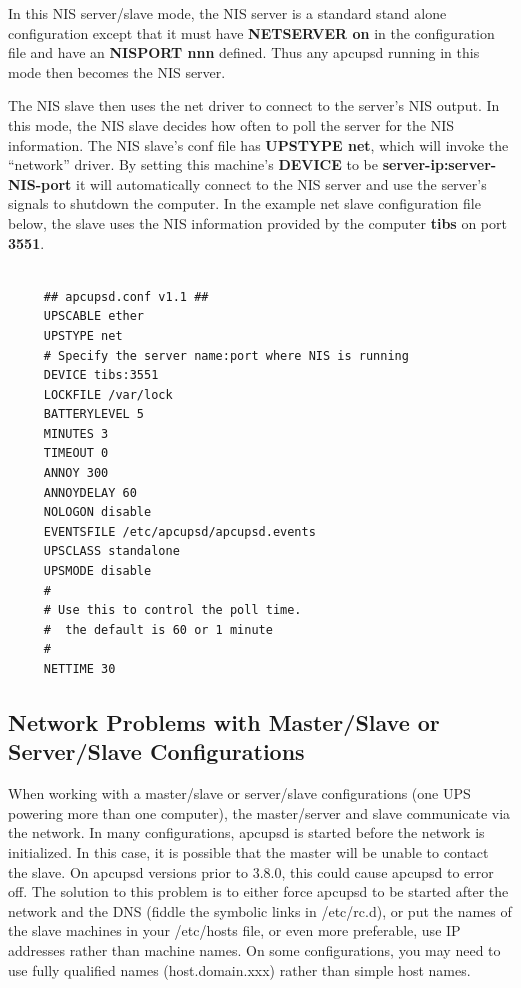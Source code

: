 {{{{{{{{{In this NIS server/slave mode, the NIS server is a standard stand alone
configuration except that it must have {\bf NETSERVER on} in the configuration
file and have an {\bf NISPORT nnn} defined. Thus any apcupsd running in this
mode then becomes the NIS server.  

The NIS slave then uses the net driver to connect to the server's NIS output.
In this mode, the NIS slave decides how often to poll the server for the NIS
information. The NIS slave's conf file has {\bf UPSTYPE net}, which will
invoke the ``network'' driver. By setting this machine's {\bf DEVICE} to be
{\bf server-ip:server-NIS-port} it will automatically connect to the NIS
server and use the server's signals to shutdown the computer.  In the example
net slave configuration file below, the slave uses the NIS information
provided by the computer {\bf tibs} on port {\bf 3551}. 

\footnotesize
\begin{verbatim}
     
     ## apcupsd.conf v1.1 ##
     UPSCABLE ether
     UPSTYPE net
     # Specify the server name:port where NIS is running
     DEVICE tibs:3551
     LOCKFILE /var/lock
     BATTERYLEVEL 5
     MINUTES 3
     TIMEOUT 0
     ANNOY 300
     ANNOYDELAY 60
     NOLOGON disable
     EVENTSFILE /etc/apcupsd/apcupsd.events
     UPSCLASS standalone
     UPSMODE disable
     #
     # Use this to control the poll time.
     #  the default is 60 or 1 minute
     #
     NETTIME 30
\end{verbatim}
\normalsize

\label{Network-Problems-with-Master_002fSlave-or-Server_002fSlave-Configuratio%
ns}

\subsection*{Network Problems with Master/Slave or Server/Slave
Configurations}

\label{index-Problems_002c-Master_002fSlave-159}
\label{index-Problems_002c-networking-160}
When working with a master/slave or server/slave configurations (one UPS
powering more than one computer), the master/server and slave communicate via
the network. In many configurations, apcupsd is started before the network is
initialized. In this case, it is possible that the master will be unable to
contact the slave. On apcupsd versions prior to 3.8.0, this could cause
apcupsd to error off. The solution to this problem is to either force apcupsd
to be started after the network and the DNS (fiddle the symbolic links in
/etc/rc.d), or put the names of the slave machines in your /etc/hosts file, or
even more preferable, use IP addresses rather than machine names. On some
configurations, you may need to use fully qualified names (host.domain.xxx)
rather than simple host names. 

}}}}}}}}}
